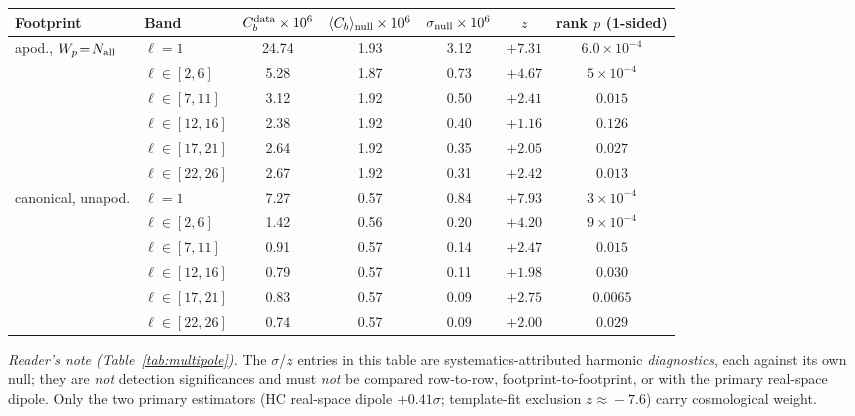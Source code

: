 \documentclass[aps,prd,twocolumn,superscriptaddress,preprintnumbers,nofootinbib,longbibliography,floatfix]{revtex4-2}
\newcommand{\sigmaunit}{\sigma}
\begin{document}
\begin{table}[t]
\begin{ruledtabular}
\begin{tabular}{llccccc}
\textbf{Footprint} & \textbf{Band} & \textbf{$C_b^{\rm data} \times 10^{6}$} &
\textbf{$\langle C_b\rangle_{\rm null} \times 10^{6}$} &
\textbf{$\sigma_{\rm null} \times 10^{6}$} &
\textbf{$z$} & \textbf{rank $p$ (1-sided)} \\
\hline
apod., $W_p\!=\!N_{\rm all}$ & $\ell\!=\!1$ & 24.74 & 1.93 & 3.12 & $+7.31$ & $6.0\times10^{-4}$ \\
 & $\ell\!\in\![2,6]$ & 5.28 & 1.87 & 0.73 & $+4.67$ & $5\times10^{-4}$ \\
 & $\ell\!\in\![7,11]$ & 3.12 & 1.92 & 0.50 & $+2.41$ & $0.015$ \\
 & $\ell\!\in\![12,16]$ & 2.38 & 1.92 & 0.40 & $+1.16$ & $0.126$ \\
 & $\ell\!\in\![17,21]$ & 2.64 & 1.92 & 0.35 & $+2.05$ & $0.027$ \\
 & $\ell\!\in\![22,26]$ & 2.67 & 1.92 & 0.31 & $+2.42$ & $0.013$ \\
\hline
canonical, unapod. & $\ell\!=\!1$ & 7.27 & 0.57 & 0.84 & $+7.93$ & $3\times10^{-4}$ \\
 & $\ell\!\in\![2,6]$ & 1.42 & 0.56 & 0.20 & $+4.20$ & $9\times10^{-4}$ \\
 & $\ell\!\in\![7,11]$ & 0.91 & 0.57 & 0.14 & $+2.47$ & $0.015$ \\
 & $\ell\!\in\![12,16]$ & 0.79 & 0.57 & 0.11 & $+1.98$ & $0.030$ \\
 & $\ell\!\in\![17,21]$ & 0.83 & 0.57 & 0.09 & $+2.75$ & $0.0065$ \\
 & $\ell\!\in\![22,26]$ & 0.74 & 0.57 & 0.09 & $+2.00$ & $0.029$ \\
\end{tabular}
\end{ruledtabular}
\end{table}

\noindent\emph{Reader's note (Table~\ref{tab:multipole}).} The $\sigma$/$z$ entries in this table are systematics-attributed harmonic \emph{diagnostics}, each against its own null; they are \emph{not} detection significances and must \emph{not} be compared row-to-row, footprint-to-footprint, or with the primary real-space dipole. Only the two primary estimators (HC real-space dipole $+0.41\sigmaunit$; template-fit exclusion $z\!\approx\!-7.6$) carry cosmological weight.
\end{document}

